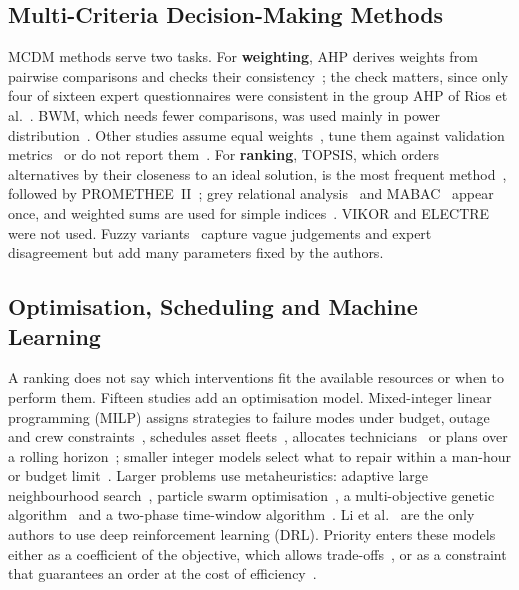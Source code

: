 \subsection{Multi-Criteria Decision-Making Methods}
\label{sec:mcdm}

MCDM methods serve two tasks. For \textbf{weighting}, AHP derives weights from pairwise comparisons and checks their consistency~\cite{ozcan2021,bulut2021,panwar2021,zhou2024}; the check matters, since only four of sixteen expert questionnaires were consistent in the group AHP of Rios et al.~\cite{rios2025}. BWM, which needs fewer comparisons, was used mainly in power distribution~\cite{enjavimadar2022,moradi2024,bahrami2021}. Other studies assume equal weights~\cite{delgado2026,darko2026,wehbi2026}, tune them against validation metrics~\cite{tang2026} or do not report them~\cite{enjavimadar2022,wittbrodt2026}. For \textbf{ranking}, TOPSIS, which orders alternatives by their closeness to an ideal solution, is the most frequent method~\cite{ozcan2021,bulut2021,bahrami2021,moradi2024}, followed by PROMETHEE~II~\cite{ozcan2021,panwar2021}; grey relational analysis~\cite{enjavimadar2022} and MABAC~\cite{tang2026} appear once, and weighted sums are used for simple indices~\cite{hedayatnia2025,wehbi2026,darko2026}. VIKOR and ELECTRE were not used. Fuzzy variants~\cite{wittbrodt2026,bahrami2021,panwar2021,bahadir2026,qiu2026} capture vague judgements and expert disagreement but add many parameters fixed by the authors.

\subsection{Optimisation, Scheduling and Machine Learning}
\label{sec:optimisation}

A ranking does not say which interventions fit the available resources or when to perform them. Fifteen studies add an optimisation model. Mixed-integer linear programming (MILP) assigns strategies to failure modes under budget, outage and crew constraints~\cite{enjavimadar2022,moradi2024}, schedules asset fleets~\cite{schulze2022}, allocates technicians~\cite{gao2024} or plans over a rolling horizon~\cite{danach2026}; smaller integer models select what to repair within a man-hour or budget limit~\cite{rios2025,rios2024,darko2026}. Larger problems use metaheuristics: adaptive large neighbourhood search~\cite{woller2023,wehbi2026}, particle swarm optimisation~\cite{bi2022,dui2026}, a multi-objective genetic algorithm~\cite{dui2025} and a two-phase time-window algorithm~\cite{geng2022}. Li et al.~\cite{li2027} are the only authors to use deep reinforcement learning (DRL). Priority enters these models either as a coefficient of the objective, which allows trade-offs~\cite{rios2025,danach2026,darko2026}, or as a constraint that guarantees an order at the cost of efficiency~\cite{gao2024,geng2022,dui2025,dui2026}.

